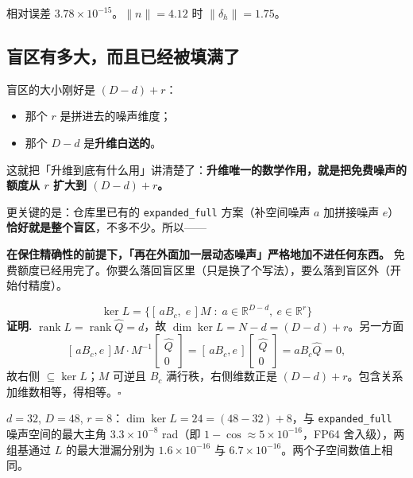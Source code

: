 \documentclass[UTF8, fontset=macnew, 11pt]{ctexart}
\newcommand{\kerL}{\ker L}
\newcommand{\Qh}{\hat Q}
\begin{document}
\begin{numbox}
相对误差 $3.78\times10^{-15}$。$\|n\|=4.12$ 时 $\|\delta_h\|=1.75$。
\end{numbox}

\subsection{盲区有多大，而且已经被填满了}

\begin{plainbox}
盲区的大小刚好是 $(D-d)+r$：
\begin{itemize}
  \item 那个 $r$ 是拼进去的噪声维度；
  \item 那个 $D-d$ 是\textbf{升维白送的}。
\end{itemize}

这就把「升维到底有什么用」讲清楚了：\textbf{升维唯一的数学作用，就是把免费噪声的额度从 $r$ 扩大到 $(D-d)+r$。}

更关键的是：仓库里已有的 \texttt{expanded\_full} 方案（补空间噪声 $a$ 加拼接噪声 $e$）\textbf{恰好就是整个盲区}，不多不少。所以——

\textbf{在保住精确性的前提下，「再在外面加一层动态噪声」严格地加不进任何东西。} 免费额度已经用完了。你要么落回盲区里（只是换了个写法），要么落到盲区外（开始付精度）。
\end{plainbox}

\begin{mathbox}[定理 3：免费噪声锥的饱和]
$$\kerL=\bigl\{[\,aB_c,\;e\,]M \;:\; a\in\mathbb R^{D-d},\ e\in\mathbb R^r\bigr\}$$
\textbf{证明.} $\operatorname{rank}L=\operatorname{rank}\Qh=d$，故 $\dim\kerL=N-d=(D-d)+r$。另一方面
$$[\,aB_c,e\,]M\cdot M^{-1}\begin{bmatrix}\Qh\\0\end{bmatrix}=[\,aB_c,e\,]\begin{bmatrix}\Qh\\0\end{bmatrix}=aB_c\Qh=0,$$
故右侧 $\subseteq\kerL$；$M$ 可逆且 $B_c$ 满行秩，右侧维数正是 $(D-d)+r$。包含关系加维数相等，得相等。$\square$
\end{mathbox}

\begin{numbox}
$d{=}32$, $D{=}48$, $r{=}8$：$\dim\kerL=24=(48{-}32)+8$，与 \texttt{expanded\_full} 噪声空间的最大主角 $3.3\times10^{-8}$ rad（即 $1-\cos\approx5\times10^{-16}$，FP64 舍入级），两组基通过 $L$ 的最大泄漏分别为 $1.6\times10^{-16}$ 与 $6.7\times10^{-16}$。两个子空间数值上相同。
\end{numbox}
\end{document}
